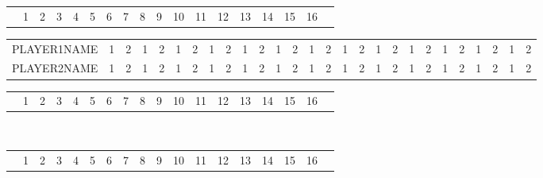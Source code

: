 \documentclass[22pt]{scrartcl}
\begin{document}
\begin{table}
\begin{tabular}{p{5cm}|c|c|c|c|c|c!{\vrule width 2pt}c|c|c|c|c|c|c|c|c|c!{\vrule width 3pt}p{1cm}!{\vrule width 3pt}}
 & 1 & 2 & 3 & 4 & 5 & 6 & 7 & 8 & 9 & 10 & 11 & 12 & 13 & 14 & 15 & 16 & \\
\end{tabular}

\begin{tabular}{p{5cm}|c|c|c|c|c|c|c|c|c|c|c|c|c|c|c|c|c|c|c|c|c|c|c|c|c|c|}

\cline{2-27}
PLAYER1NAME & \footnotesize 1 & \footnotesize 2 & \footnotesize 1 & \footnotesize 2 & \footnotesize 1 & \footnotesize 2 & \footnotesize 1 & \footnotesize 2 & \footnotesize 1 & \footnotesize 2 & \footnotesize 1 & \footnotesize 2 & \footnotesize 1 & \footnotesize 2 & \footnotesize 1 & \footnotesize 2 & \footnotesize 1 & \footnotesize 2 & \footnotesize 1 & \footnotesize 2 & \footnotesize 1 & \footnotesize 2 & \footnotesize 1 & \footnotesize 2 & \footnotesize 1 & \footnotesize 2 \\
\cline{1-27} 

\cline{1-27}
PLAYER2NAME & \footnotesize 1 & \footnotesize 2 & \footnotesize 1 & \footnotesize 2 & \footnotesize 1 & \footnotesize 2 & \footnotesize 1 & \footnotesize 2 & \footnotesize 1 & \footnotesize 2 & \footnotesize 1 & \footnotesize 2 & \footnotesize 1 & \footnotesize 2 & \footnotesize 1 & \footnotesize 2 & \footnotesize 1 & \footnotesize 2 & \footnotesize 1 & \footnotesize 2 & \footnotesize 1 & \footnotesize 2 & \footnotesize 1 & \footnotesize 2 & \footnotesize 1 & \footnotesize 2 \\
\cline{2-27}

\end{tabular}

\begin{tabular}{p{5cm}|c|c|c|c|c|c!{\vrule width 2pt}c|c|c|c|c|c|c|c|c|c!{\vrule width 3pt}p{1cm}!{\vrule width 3pt}}

& 1 & 2 & 3 & 4 & 5 & 6 & 7 & 8 & 9 & 10 & 11 & 12 & 13 & 14 & 15 & 16 & \\
\end{tabular}

~\\

\begin{tabular}{p{5cm}|c|c|c|c|c|c!{\vrule width 2pt}c|c|c|c|c|c|c|c|c|c!{\vrule width 3pt}p{1cm}!{\vrule width 3pt}}
 & 1 & 2 & 3 & 4 & 5 & 6 & 7 & 8 & 9 & 10 & 11 & 12 & 13 & 14 & 15 & 16 & \\
\end{tabular}


\end{table}
\end{document}
